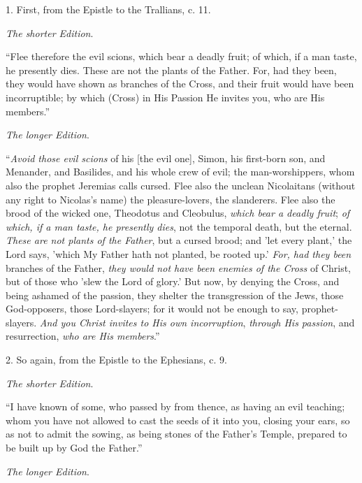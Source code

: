 1. First, from the Epistle to
the Trallians, c. 11.

\emph{The
shorter Edition}.

``Flee
therefore the evil scions, which bear a deadly fruit; of which, if a
man taste, he presently dies. These are not the plants of the Father.
For, had they been, they would have shown as branches of the Cross,
and their fruit would have been incorruptible; by which (Cross) in His
Passion He invites you, who are His members.''

\emph{The
longer Edition}.

``\emph{Avoid
those evil scions} of his [the evil one], Simon, his first-born
son, and Menander, and Basilides, and his whole crew of evil; the
man-worshippers, whom also the prophet Jeremias calls cursed. Flee
also the unclean Nicolaitans (without any right to Nicolas's name) the
pleasure-lovers, the slanderers. Flee also the brood of the wicked
one, Theodotus and Cleobulus, \emph{which bear a deadly fruit}; \emph{of
which, if a man taste, he presently dies}, not the temporal death,
but the eternal. \emph{These are not plants of the Father}, but a
cursed brood; and 'let every plant,' the Lord says, 'which My Father
hath not planted, be rooted up.' \emph{For, had they been} branches of
the Father, \emph{they would not have been enemies of the Cross} of
Christ, but of those who 'slew the Lord of glory.' But now, by
denying the Cross, and being ashamed of the passion, they shelter the
transgression of the Jews, those God-opposers, those Lord-slayers; for
it would not be enough to say, prophet-slayers. \emph{And you Christ
invites to His own incorruption}, \emph{through His passion}, and
resurrection, \emph{who are His members}.''

2. So again, from the Epistle
to the Ephesians, c. 9.

\emph{The
shorter Edition}.

``I
have known of some, who passed by from thence, as having an evil
teaching; whom you have not allowed to cast the seeds of it into you,
closing your ears, so as not to admit the sowing, as being stones of
the Father's Temple, prepared to be built up by God the Father.''

\emph{The
longer Edition}.


